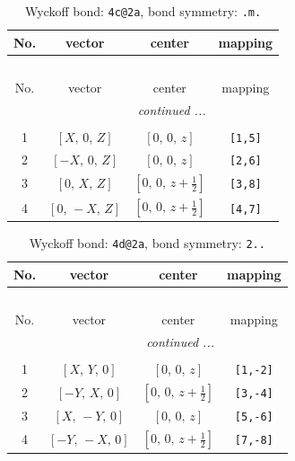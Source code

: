 \documentclass[fleqn,8pt]{jsarticle}
\begin{document}
\renewcommand{\arraystretch}{1.2}
\begin{longtable}{cccc}
\caption{Wyckoff bond: {\tt 4c@2a}, bond symmetry: {\tt .m.}}
 \\
 \hline \hline
No. & vector & center & mapping \\ \hline \endfirsthead

\multicolumn{3}{l}{\tablename\ \thetable{}} \\
 \hline \hline
No. & vector & center & mapping \\ \hline \endhead

 \hline \hline
\multicolumn{3}{r}{\footnotesize\it continued ...} \\ \endfoot

 \hline \hline
\multicolumn{3}{r}{} \\ \endlastfoot

1 & $\left[ X,\, 0,\, Z \right]$ & $\left[ 0,\, 0,\, z \right]$ & {\tt [1,5]} \\ \hline
2 & $\left[ - X,\, 0,\, Z \right]$ & $\left[ 0,\, 0,\, z \right]$ & {\tt [2,6]} \\ \hline
3 & $\left[ 0,\, X,\, Z \right]$ & $\left[ 0,\, 0,\, z + \frac{1}{2} \right]$ & {\tt [3,8]} \\ \hline
4 & $\left[ 0,\, - X,\, Z \right]$ & $\left[ 0,\, 0,\, z + \frac{1}{2} \right]$ & {\tt [4,7]} \\
\end{longtable}
\renewcommand{\arraystretch}{1.2}
\begin{longtable}{cccc}
\caption{Wyckoff bond: {\tt 4d@2a}, bond symmetry: {\tt 2..}}
 \\
 \hline \hline
No. & vector & center & mapping \\ \hline \endfirsthead

\multicolumn{3}{l}{\tablename\ \thetable{}} \\
 \hline \hline
No. & vector & center & mapping \\ \hline \endhead

 \hline \hline
\multicolumn{3}{r}{\footnotesize\it continued ...} \\ \endfoot

 \hline \hline
\multicolumn{3}{r}{} \\ \endlastfoot

1 & $\left[ X,\, Y,\, 0 \right]$ & $\left[ 0,\, 0,\, z \right]$ & {\tt [1,-2]} \\ \hline
2 & $\left[ - Y,\, X,\, 0 \right]$ & $\left[ 0,\, 0,\, z + \frac{1}{2} \right]$ & {\tt [3,-4]} \\ \hline
3 & $\left[ X,\, - Y,\, 0 \right]$ & $\left[ 0,\, 0,\, z \right]$ & {\tt [5,-6]} \\ \hline
4 & $\left[ - Y,\, - X,\, 0 \right]$ & $\left[ 0,\, 0,\, z + \frac{1}{2} \right]$ & {\tt [7,-8]} \\
\end{longtable}
\end{document}
